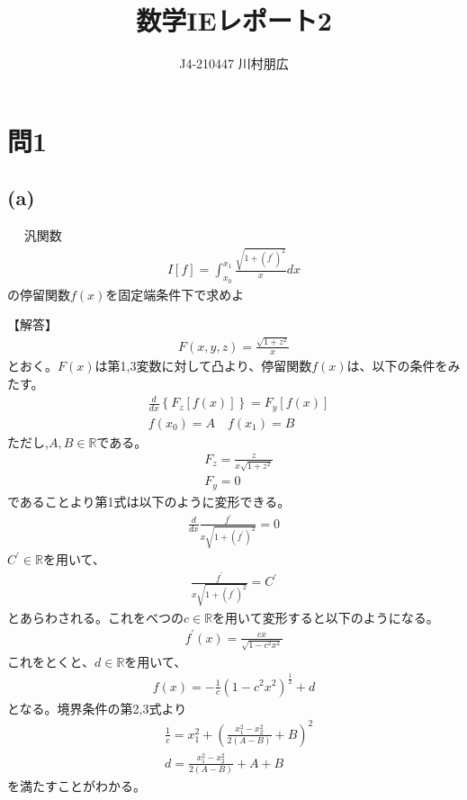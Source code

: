 \documentclass[pdflatex,ja=standard,fleqn]{bxjsarticle}
\title{数学IEレポート2}
\author{J4-210447 川村朋広}
\begin{document}
\maketitle

\section*{問1}
\subsection*{(a)}
\begin{screen}　
    汎関数
    \begin{eqnarray*}
        I \left[f\right]=\int_{x_{0}}^{x_{1}} \frac{\sqrt{1+(f^{\prime})^2}}{x}dx
    \end{eqnarray*}
    の停留関数$f(x)$を固定端条件下で求めよ
\end{screen}
【解答】
\begin{eqnarray*}
    F(x,y,z)=\frac{\sqrt{1+z^2}}{x}
\end{eqnarray*}
とおく。$F(x)$は第1,3変数に対して凸より、停留関数$f(x)$は、以下の条件をみたす。
\begin{align*}
    &\frac{d}{dx}\left\{F_{z}\left[f(x)\right]\right\}=F_{y}\left[f(x)\right]\\
    &f(x_{0})=A\quad f(x_{1})=B
\end{align*}
ただし,$A,B\in\mathbb{R}$である。
\begin{align*}
    &F_{z}=\frac{z}{x\sqrt{1+z^2}}\\
    &F_{y}=0
\end{align*}
であることより第1式は以下のように変形できる。
\begin{eqnarray*}
    \frac{d}{dx} \frac{f^{\prime}}{x\sqrt{1+(f^{\prime})^2}}=0
\end{eqnarray*}
$C^{\prime}\in\mathbb{R}$を用いて、
\begin{eqnarray*}
    \frac{f^{\prime}}{x\sqrt{1+(f^{\prime})^2}}=C^{\prime}
\end{eqnarray*}
とあらわされる。これをべつの$c\in\mathbb{R}$を用いて変形すると以下のようになる。
\begin{eqnarray*}
    f^{\prime}(x)=\frac{cx}{\sqrt{1-c^2x^2}}
\end{eqnarray*}
これをとくと、$d\in\mathbb{R}$を用いて、
\begin{eqnarray*}
    f(x)=-\frac{1}{c}(1-c^2x^2)^{\frac{1}{2}}+d
\end{eqnarray*}
となる。境界条件の第2,3式より
\begin{align*}
    &\frac{1}{c}=x_{1}^2+\left(\frac{x_{1}^2-x_{2}^2}{2(A-B)}+B\right)^2\\
    &d=\frac{x_{1}^2-x_{2}^2}{2(A-B)}+A+B
\end{align*}
を満たすことがわかる。
\end{document}

